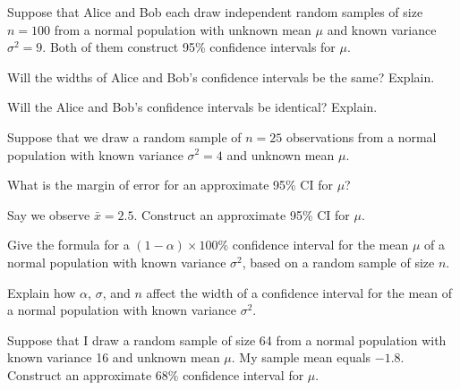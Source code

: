 \documentclass[addpoints,12pt]{exam}
\begin{document}
\begin{questions}

\question Suppose that Alice and Bob each draw independent random samples of size $n=100$ from a normal population with unknown mean $\mu$ and known variance $\sigma^2=9$. Both of them construct 95\% confidence intervals for $\mu$. 
\begin{parts}
  \item Will the widths of Alice and Bob's confidence intervals be the same? Explain. 
  \item Will the Alice and Bob's confidence intervals be identical? Explain.
\end{parts}

\question Suppose that we draw a random sample of $n = 25$ observations from a normal population with known variance $\sigma^2 = 4$ and unknown mean $\mu$. 
\begin{parts}
 \item What is the margin of error for an approximate 95\% CI for $\mu$?
 \item Say we observe $\bar{x} = 2.5$. Construct an approximate 95\% CI for $\mu$.
\end{parts}

\question Give the formula for a $(1 - \alpha)\times 100\%$ confidence interval for the mean $\mu$ of a normal population with known variance $\sigma^2$, based on a random sample of size $n$.

\question Explain how $\alpha$, $\sigma$, and $n$ affect the width of a confidence interval for the mean of a normal population with known variance $\sigma^2$.

\question Suppose that I draw a random sample of size 64 from a normal population with known variance 16 and unknown mean $\mu$. My sample mean equals $-1.8$. Construct an approximate 68\% confidence interval for $\mu$.



\end{questions}
\end{document}
